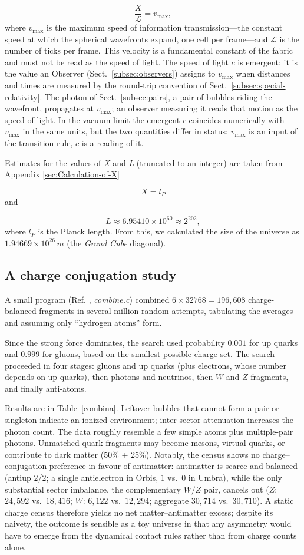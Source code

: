 \documentclass{ijuc}
\begin{document}
\[
\frac{X}{\mathcal{L}}=v_{\max},
\]
where $v_{\max}$ is the maximum speed of information transmission---the constant speed at which the spherical wavefronts expand, one cell per frame---and $\mathcal{L}$ is the number of ticks per frame. 
This velocity is a fundamental constant of the fabric and must not be read as the speed of light. The speed of light $c$ is emergent: it is the value an Observer (Sect.~\ref{subsec:observers}) assigns to $v_{\max}$ when distances and times are measured by the round-trip convention of Sect.~\ref{subsec:special-relativity}. The photon of Sect.~\ref{subsec:pairs}, a pair of bubbles riding the wavefront, propagates at $v_{\max}$; an observer measuring it reads that motion as the speed of light. In the vacuum limit the emergent $c$ coincides numerically with $v_{\max}$ in the same units, but the two quantities differ in status: $v_{\max}$ is an input of the transition rule, $c$ is a reading of it.

Estimates for the values of \emph{X} and \emph{L }(truncated to an integer) are taken from Appendix \ref{sec:Calculation-of-X}

\[
X=l_{P}
\]
and

\[
L\approx6.95410\times10^{60}\approx2^{202},
\]
where $l_{P}$ is the Planck length. From this, we calculated the size of the universe as $1.94669\times10^{26}\,m$ (the \emph{Grand Cube} diagonal).

\subsection{A charge conjugation study}

A small program (Ref. \cite{af_neto}, \emph{combine.c}) combined $6\times32768=196{,}608$ charge-balanced fragments in several million random attempts, tabulating the averages and assuming only ``hydrogen atoms'' form.

Since the strong force dominates, the search used probability $0.001$ for up quarks and $0.999$ for gluons, based on the smallest possible charge set. The search proceeded in four stages: gluons and up quarks (plus electrons, whose number depends on up quarks), then photons and neutrinos, then $W$ and $Z$ fragments, and finally anti-atoms.

Results are in Table~\ref{combina}. Leftover bubbles that cannot form a pair or singleton indicate an ionized environment; inter-sector attenuation increases the photon count. The data roughly resemble a few simple atoms plus multiple-pair photons. Unmatched quark fragments may become mesons, virtual quarks, or contribute to dark matter (50\% + 25\%). Notably, the census shows no charge--conjugation preference in favour of antimatter: antimatter is scarce and balanced (antiup $2$/$2$; a single antielectron in Orbis, $1$ vs.\ $0$ in Umbra), while the only substantial sector imbalance, the complementary $W/Z$ pair, cancels out ($Z$: $24{,}592$ vs.\ $18{,}416$; $W$: $6{,}122$ vs.\ $12{,}294$; aggregate $30{,}714$ vs.\ $30{,}710$). A static charge census therefore yields no net matter--antimatter excess; despite its naivety, the outcome is sensible as a toy universe in that any asymmetry would have to emerge from the dynamical contact rules rather than from charge counts alone.
\end{document}
